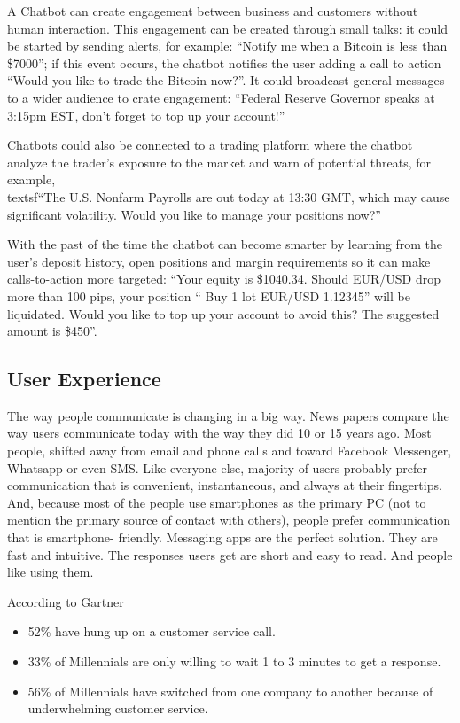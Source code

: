 \documentclass[	DIV=calc,%
							paper=letter,%
							fontsize=12pt%
                            ]{scrartcl}	 					%
\begin{document}
A Chatbot can create engagement between business and customers without human interaction. This engagement can be created through small talks: it could be started by sending alerts, for example: \textsf{``Notify me when a Bitcoin is less than \$7000''}; if this event occurs, the chatbot notifies the user adding a call to action \textsf{``Would you like to trade the Bitcoin now?''}. It could broadcast general messages to a wider audience to crate engagement: \textsf{``Federal Reserve Governor speaks at 3:15pm EST, don’t forget to top up your account!''}

Chatbots could also be connected to a trading platform where the chatbot analyze the trader’s exposure to the market and warn of potential threats, for example, \\textsf{``The U.S. Nonfarm Payrolls are out today at 13:30 GMT, which may cause significant volatility. Would you like to manage your positions now?''}
 
With the past of the time the chatbot can become smarter by learning from the user’s deposit history, open positions and margin requirements so it can make calls-to-action more targeted: \textsf{``Your equity is \$1040.34. Should EUR/USD drop more than 100 pips, your position “ Buy 1 lot EUR/USD \@ 1.12345” will be liquidated. Would you like to top up your account to avoid this? The suggested amount is \$450''}.

\subsection{\label{sec:level2}User Experience}

The way people communicate is changing in a big way. News papers compare the way users communicate today with the way they did 10 or 15 years ago. Most people, shifted away from email and phone calls and toward Facebook Messenger, Whatsapp or even SMS. Like everyone else, majority of users probably prefer communication that is convenient, instantaneous, and always at their fingertips. And, because most of the people use smartphones as the primary PC (not to mention the primary source of contact with others), people prefer communication that is smartphone- friendly. Messaging apps are the perfect solution. They are fast and intuitive. The responses users get are short and easy to read. And people like using them.

According to Gartner\cite{holtgraves2007perceiving}
\begin{itemize}
\item 52\% have hung up on a customer service call. 
\item 33\% of Millennials are only willing to wait 1 to 3 minutes to get a response.\cite{lenhart2010teens} 
\item 56\% of Millennials have switched from one company to another because of underwhelming customer service.\cite{hsiao2016exploring}
\end{itemize}
\end{document}
